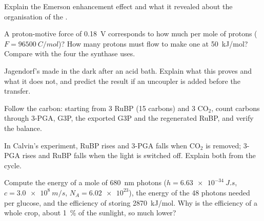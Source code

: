 \begin{exercise}[$\star\star$]\label{exo:b1:photosynthesis:5}
Explain the Emerson enhancement effect and what it revealed about the
organisation of the .
\end{exercise}

\begin{exercise}[$\star\star$]\label{exo:b1:photosynthesis:6}
A proton-motive force of \qty{0.18}{V} corresponds to how much  per mole of protons ($F = \qty{96500}{C/mol}$)? How many
protons must flow to make one  at \qty{50}{kJ/mol}? Compare with
the four the synthase uses.
\end{exercise}

\begin{exercise}[$\star\star$]\label{exo:b1:photosynthesis:7}
Jagendorf's  made  in the dark after an acid bath.
Explain what this proves and what it does not, and predict the result
if an uncoupler is added before the transfer.
\end{exercise}

\begin{exercise}[$\star\star$]\label{exo:b1:photosynthesis:8}
Follow the carbon: starting from 3 RuBP (15 carbons) and 3
$\mathrm{CO_2}$, count carbons through 3-PGA, G3P, the exported G3P and
the regenerated RuBP, and verify the balance.
\end{exercise}

\begin{exercise}[$\star\star$]\label{exo:b1:photosynthesis:9}
In Calvin's experiment, RuBP rises and 3-PGA falls when $\mathrm{CO_2}$
is removed; 3-PGA rises and RuBP falls when the light is switched off.
Explain both from the cycle.
\end{exercise}

\begin{exercise}[$\star\star\star$]\label{exo:b1:photosynthesis:10}
Compute the energy of a mole of \qty{680}{nm} photons ($h =
\qty{6.63e-34}{J.s}$, $c = \qty{3.0e8}{m/s}$, $N_A = \num{6.02e23}$),
the energy of the 48 photons needed per glucose, and the efficiency
of storing \qty{2870}{kJ/mol}. Why is the efficiency of a whole crop,
about \qty{1}{\%} of the sunlight, so much lower?
\end{exercise}

